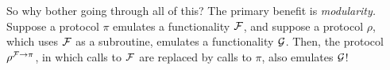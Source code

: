 So why bother going through all of this? The primary benefit is
\emph{modularity.}  Suppose a protocol $\pi$ emulates a functionality $\mathcal{{F}}$,
and suppose a protocol $\rho$, which uses $\mathcal{{F}}$ as a subroutine, emulates a
functionality $\mathcal{{G}}$.  Then, the protocol $\rho^{\mathcal{{F}} -> \pi}$, in which calls to
$\mathcal{{F}}$ are replaced by calls to $\pi$, also emulates $\mathcal{{G}}$!

